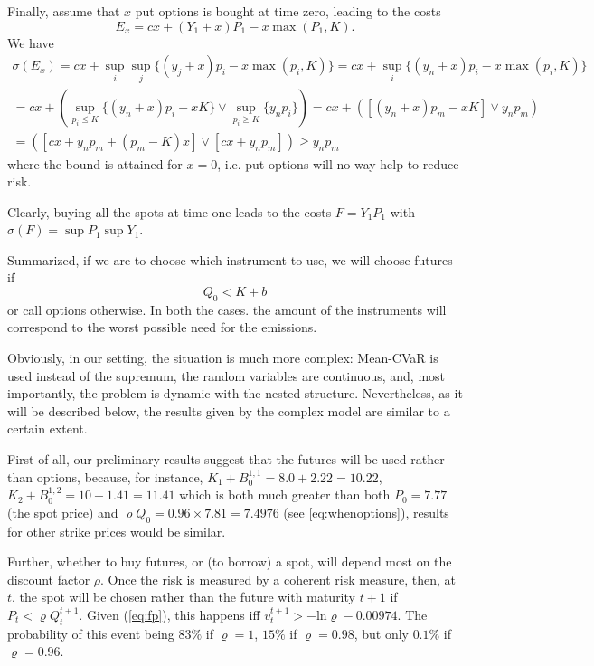 \documentclass[3p,times]{elsarticle}
\begin{document}
Finally, assume that $x$ put options is bought at time zero, leading to the costs
$$
E_x = cx + (Y_1 + x) P_1 - x \max(P_1,K).
$$
We have
\begin{multline*}
\sigma(E_x)= cx + \sup_i \sup_j \{(y_j + x) p_i - x \max(p_i,K)\}
=cx + \sup_i\{ (y_n + x) p_i - x \max(p_i,K)\}
\\
=cx + 
\left(
\sup_{p_i \leq K}\{ (y_n + x) p_i - x K\} \vee 
\sup_{p_i \geq K}\{ y_n p_i \}\right)
=cx + 
\left(
[(y_n + x) p_m - x K] \vee  y_n p_m \right)
\\=
\left(
[cx+y_np_m + (p_m-K) x] 
\vee 
[cx+ y_n p_m] 
\right)
\geq y_n p_m
\end{multline*}
where the bound is attained for $x=0$, i.e. put options will no way help to reduce risk.

Clearly, buying all the spots at time one leads to the costs $F = Y_1 P_1$ with $\sigma(F)=\sup P_1 \sup Y_1$.

Summarized, if we are to choose which instrument to use, we will choose futures if 
\begin{equation}\label{eq:whenoptions}
Q_0 < K+b
\end{equation}
 or call options otherwise. In both the cases. the amount of the instruments will correspond to the worst possible need for the emissions.

Obviously, in our setting, the situation is much more complex: Mean-CVaR is used instead of the supremum, the random variables are continuous, and, most importantly, the problem is dynamic with the nested structure. Nevertheless, as it will be described below, the results given by the complex model are similar to a certain extent. 

First of all, our preliminary results suggest that the futures will be used rather than options, because, for instance, $K_1+B_0^{1,1}=8.0+2.22=10.22$, $K_2+B_0^{1,2}=10+1.41=11.41$ which is both much greater than both $P_0=7.77$ (the spot price) and $\varrho Q_0=0.96 \times 7.81=7.4976$ (see  \ref{eq:whenoptions}), results for other strike prices would be similar. 

Further, whether to buy futures, or (to borrow) a spot, will depend most on the discount factor $\rho$. Once the risk is measured by a coherent risk measure, then, at $t$, the spot will be chosen rather than the future with maturity $t+1$ if $P_t < \varrho Q^{t+1}_t$. Given (\ref{eq:fp}), this happens iff $v^{t+1}_t>-\mathrm{ln} \varrho - 0.00974$. The probability of this event being $83\%$ if $\varrho = 1$, $15\%$ if $\varrho = 0.98$, but only $0.1\%$ if $\varrho = 0.96$.
\end{document}
